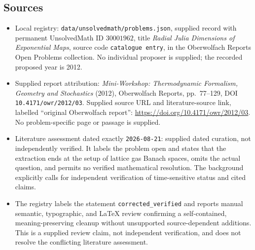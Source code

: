 \documentclass[11pt]{article}
\begin{document}
\subsection{Sources}
\begin{itemize}
\item Local registry: \texttt{data/unsolvedmath/problems.json}, supplied record with permanent UnsolvedMath ID \(30001962\), title \emph{Radial Julia Dimensions of Exponential Maps}, source code \texttt{catalogue entry}, in the Oberwolfach Reports Open Problems collection. No individual proposer is supplied; the recorded proposed year is 2012.
\item Supplied report attribution: \emph{Mini-Workshop: Thermodynamic Formalism, Geometry and Stochastics} (2012), Oberwolfach Reports, pp.\ 77--129, DOI \texttt{10.4171/owr/2012/03}. Supplied source URL and literature-source link, labelled ``original Oberwolfach report'': \url{https://doi.org/10.4171/owr/2012/03}. No problem-specific page or passage is supplied.
\item Literature assessment dated exactly \texttt{2026-08-21}: supplied dated curation, not independently verified. It labels the problem open and states that the extraction ends at the setup of lattice gas Banach spaces, omits the actual question, and permits no verified mathematical resolution. The background explicitly calls for independent verification of time-sensitive status and cited claims.
\item The registry labels the statement \texttt{corrected\_verified} and reports manual semantic, typographic, and LaTeX review confirming a self-contained, meaning-preserving cleanup without unsupported source-dependent additions. This is a supplied review claim, not independent verification, and does not resolve the conflicting literature assessment.
\end{itemize}
\end{document}
